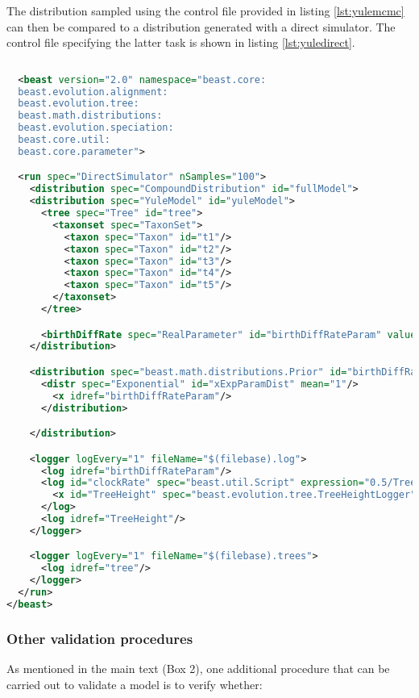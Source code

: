 \documentclass[oneside]{article}
\begin{document}
The distribution sampled using the control file provided in listing
\ref{lst:yulemcmc} can then be compared to a distribution generated
with a direct simulator.
The control file specifying the latter task is shown in listing
\ref{lst:yuledirect}.

{\small
\singlespacing
\begin{lstlisting}[language=XML, caption=BEAST 2 control file for
  generating a distribution under the Yule model with direct simulation., label={lst:yuledirect}]
  
  <beast version="2.0" namespace="beast.core:
  beast.evolution.alignment:
  beast.evolution.tree:
  beast.math.distributions:
  beast.evolution.speciation:
  beast.core.util:
  beast.core.parameter">

  <run spec="DirectSimulator" nSamples="100">
    <distribution spec="CompoundDistribution" id="fullModel">
    <distribution spec="YuleModel" id="yuleModel">
      <tree spec="Tree" id="tree">
        <taxonset spec="TaxonSet">
          <taxon spec="Taxon" id="t1"/>
          <taxon spec="Taxon" id="t2"/>
          <taxon spec="Taxon" id="t3"/>
          <taxon spec="Taxon" id="t4"/>
          <taxon spec="Taxon" id="t5"/>
        </taxonset>
      </tree>

      <birthDiffRate spec="RealParameter" id="birthDiffRateParam" value="1.0"/>
    </distribution>

    <distribution spec="beast.math.distributions.Prior" id="birthDiffRatePrior">
      <distr spec="Exponential" id="xExpParamDist" mean="1"/>
        <x idref="birthDiffRateParam"/>
      </distribution>

    </distribution>

    <logger logEvery="1" fileName="$(filebase).log">
      <log idref="birthDiffRateParam"/>
      <log id="clockRate" spec="beast.util.Script" expression="0.5/TreeHeight">
        <x id="TreeHeight" spec="beast.evolution.tree.TreeHeightLogger" tree="@tree"/>
      </log>
      <log idref="TreeHeight"/>
    </logger>

    <logger logEvery="1" fileName="$(filebase).trees">
      <log idref="tree"/>
    </logger>
  </run>
</beast>
\end{lstlisting}
}

\subsubsection*{Other validation procedures}

As mentioned in the main text (Box 2), one additional procedure
that can be carried out to validate a model is to verify whether:
\end{document}
